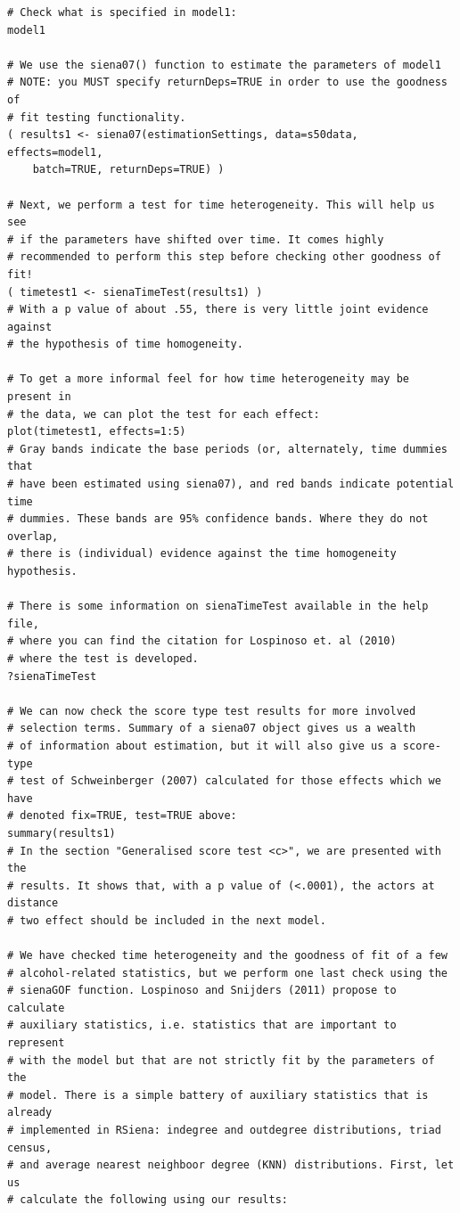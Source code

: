 \documentclass[a4paper,fleqn,11pt]{article}
\newcommand{\+}{\, + \,}
\begin{document}
{\begin{footnotesize}
\begin{verbatim}
# Check what is specified in model1:
model1

# We use the siena07() function to estimate the parameters of model1
# NOTE: you MUST specify returnDeps=TRUE in order to use the goodness of
# fit testing functionality.
( results1 <- siena07(estimationSettings, data=s50data, effects=model1,
	batch=TRUE, returnDeps=TRUE) )

# Next, we perform a test for time heterogeneity. This will help us see
# if the parameters have shifted over time. It comes highly
# recommended to perform this step before checking other goodness of fit!
( timetest1 <- sienaTimeTest(results1) )
# With a p value of about .55, there is very little joint evidence against
# the hypothesis of time homogeneity.

# To get a more informal feel for how time heterogeneity may be present in
# the data, we can plot the test for each effect:
plot(timetest1, effects=1:5)
# Gray bands indicate the base periods (or, alternately, time dummies that
# have been estimated using siena07), and red bands indicate potential time
# dummies. These bands are 95% confidence bands. Where they do not overlap,
# there is (individual) evidence against the time homogeneity hypothesis.

# There is some information on sienaTimeTest available in the help file,
# where you can find the citation for Lospinoso et. al (2010)
# where the test is developed.
?sienaTimeTest

# We can now check the score type test results for more involved
# selection terms. Summary of a siena07 object gives us a wealth
# of information about estimation, but it will also give us a score-type
# test of Schweinberger (2007) calculated for those effects which we have
# denoted fix=TRUE, test=TRUE above:
summary(results1)
# In the section "Generalised score test <c>", we are presented with the
# results. It shows that, with a p value of (<.0001), the actors at distance
# two effect should be included in the next model.

# We have checked time heterogeneity and the goodness of fit of a few
# alcohol-related statistics, but we perform one last check using the
# sienaGOF function. Lospinoso and Snijders (2011) propose to calculate
# auxiliary statistics, i.e. statistics that are important to represent
# with the model but that are not strictly fit by the parameters of the
# model. There is a simple battery of auxiliary statistics that is already
# implemented in RSiena: indegree and outdegree distributions, triad census,
# and average nearest neighboor degree (KNN) distributions. First, let us
# calculate the following using our results:


\end{verbatim}
\end{footnotesize}}
\end{document}
